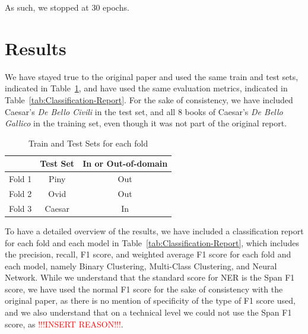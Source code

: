 \documentclass[11pt]{article}
\begin{document}
As such, we stopped at 30 epochs.

\section{Results}
We have stayed true to the original paper and used the same train and test sets, indicated in Table~\ref{tab:Train-Test-Sets}, 
and have used the same evaluation metrics, indicated in Table~\ref{tab:Classification-Report}. For the sake of consistency, we have included
Caesar's \textit{De Bello Civili} in the test set, and all 8 books of Caesar's \textit{De Bello Gallico} in the training set,
even though it was not part of the original report.

\begin{table}[H]
  \centering
  \begin{tabular}{|l|c|c|}
  \hline
  \textbf{} & \textbf{Test Set} & \textbf{In or Out-of-domain} \\
  \hline
  Fold 1   & Piny & Out \\
  \hline
  Fold 2   & Ovid & Out \\
  \hline
  Fold 3   & Caesar & In \\
  \hline
  \end{tabular}
  \caption{Train and Test Sets for each fold}
  \label{tab:Train-Test-Sets}
\end{table}

To have a detailed overview of the results, we have included a classification report for each fold and each model 
in Table~\ref{tab:Classification-Report}, which includes the precision, recall, F1 score, and weighted average F1 score for each fold and each model,
namely Binary Clustering, Multi-Class Clustering, and Neural Network. While we understand that the standard score for NER is the
Span F1 score, we have used the normal F1 score for the sake of consistency with the original paper, as there is no mention of specificity of the type
of F1 score used, and we also understand that on a technical level we could not use the Span F1 score, as \textcolor{red}{!!!INSERT REASON!!!}.
\end{document}
